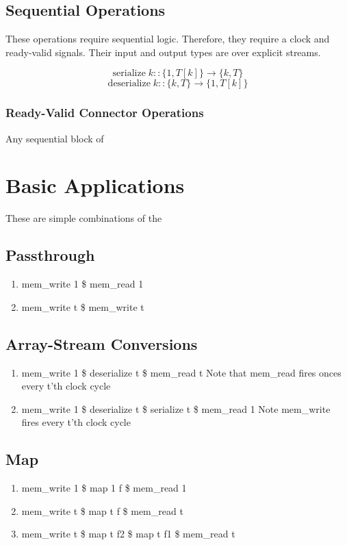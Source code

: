 \documentclass[11pt,fleqn]{article}
\numberwithin{equation}{subsection}
\begin{document}
\subsection{Sequential Operations}
These operations require sequential logic. Therefore, they require a clock and
ready-valid signals. Their input and output types are over explicit streams.

\[
    \text{serialize}\;k :: \{1, T[k]\} \rightarrow \{k, T\}
\]
\[
    \text{deserialize}\;k :: \{k, T\} \rightarrow \{1, T[k]\}
\]

\subsubsection{Ready-Valid Connector Operations}
Any sequential block of


\section{Basic Applications}
These are simple combinations of the 
\subsection{Passthrough}
\begin{enumerate}
    \item mem\_write 1 \$ mem\_read 1 
    \item mem\_write t \$ mem\_write t
\end{enumerate}

\subsection{Array-Stream Conversions}
\begin{enumerate}
    \item mem\_write 1 \$ deserialize t \$ mem\_read t
        \subitem Note that mem\_read fires onces every t'th clock cycle
    \item mem\_write 1 \$ deserialize t \$ serialize t \$ mem\_read 1
        \subitem Note mem\_write fires every t'th clock cycle
\end{enumerate}

\subsection{Map}
\begin{enumerate}
    \item mem\_write 1 \$ map 1 f \$ mem\_read 1
    \item mem\_write t \$ map t f \$ mem\_read t
    \item mem\_write t \$ map t f2 \$ map t f1 \$ mem\_read t
\end{enumerate}
\end{document}
